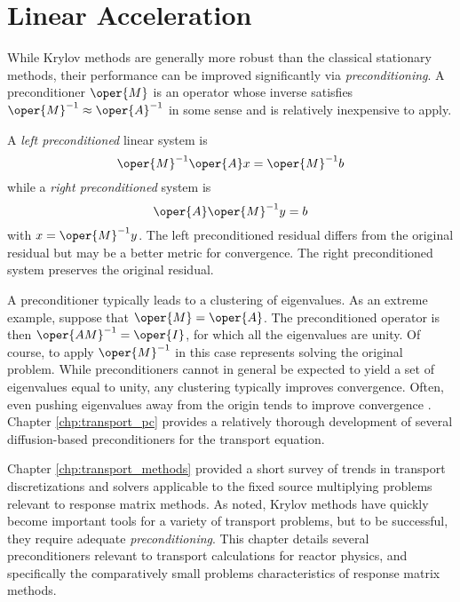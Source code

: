 \chapter{Linear Acceleration}
\label{lec:linear_acceleration}


While Krylov methods are generally more robust than the classical 
stationary methods, their performance can be improved significantly
via \emph{ preconditioning}.  A preconditioner $\oper{M}$ is an operator 
whose inverse satisfies $\oper{M}^{-1} \approx \oper{A}^{-1}$ in some sense 
and is relatively inexpensive to apply.

A \emph{ left preconditioned} linear system is
\begin{equation}
  \oper{M}^{-1}\oper{A}x = \oper{M}^{-1}b
\end{equation}
while a \emph{ right preconditioned} system is 
\begin{equation}
  \oper{A}\oper{M}^{-1} y = b
\end{equation}
with $x = \oper{M}^{-1} y$.  The left preconditioned residual differs 
from the original residual but may be a better metric for convergence. 
The right preconditioned system preserves the original residual.  

A preconditioner typically leads to a clustering of eigenvalues.  As 
an extreme example, suppose that $\oper{M} = \oper{A}$.  The 
preconditioned operator is then $\oper{AM}^{-1} = \oper{I}$, for 
which all the eigenvalues are unity.  Of course, to apply $\oper{M}^{-1}$ 
in this case represents solving the original problem.  While preconditioners
cannot in general be expected to yield a set of eigenvalues equal to unity, 
any clustering typically improves convergence.  Often, even pushing 
eigenvalues away from the origin tends to improve 
convergence \cite{larsen2010ado}.
Chapter \ref{chp:transport_pc} provides a relatively thorough 
development of several diffusion-based preconditioners for the 
transport equation.



Chapter \ref{chp:transport_methods} provided a short survey of trends in 
transport discretizations and solvers applicable to the fixed source 
multiplying problems relevant to response matrix methods.  As noted, 
Krylov methods have quickly become important tools for a variety of 
transport problems, but to be successful, they require adequate 
\emph{ preconditioning}.  
This chapter details several preconditioners 
relevant to transport calculations for reactor physics, and specifically 
the comparatively small problems characteristics of response matrix 
methods.

